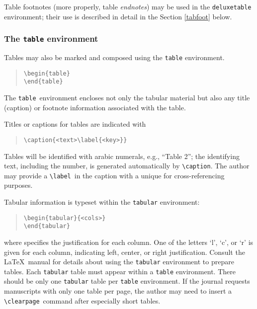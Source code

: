 \documentclass[preprint2]{aastex}
\begin{document}
Table footnotes (more properly, table \emph{endnotes}) 
may be used in the \texttt{deluxetable} environment; 
their use is described in detail in the Section 
 \ref{tabfoot} below. 
 
\subsubsection{The {\tt table} environment} 
 
Tables may also be marked and composed using the \texttt{table} environment. 
\begin{quote} 
\begin{verbatim} 
\begin{table} 
\end{table} 
\end{verbatim} 
\end{quote} 
The 
\texttt{table}\ environment 
encloses not only the tabular 
material but also any title (caption) or footnote information 
associated with the table. 
 
Titles or captions for tables are indicated with 
\begin{quote} 
\begin{verbatim} 
\caption{<text>\label{<key>}} 
\end{verbatim} 
\end{quote} 
Tables will be identified with arabic numerals, e.g., ``Table 2''; 
the identifying text, including the number, is generated automatically 
by \verb"\caption". 
 The author 
may provide a \verb"\label"\ in the caption with a unique  
for cross-referencing 
purposes. 
 
Tabular information is typeset within the 
\texttt{tabular} environment: 
\begin{quote} 
\begin{verbatim} 
\begin{tabular}{<cols>} 
\end{tabular} 
\end{verbatim} 
\end{quote} 
where  specifies the justification for each column. 
One of the letters `l', `c', or `r' is given for each column, 
indicating left, center, or right justification. 
Consult the \LaTeX\ manual \citep{Lamport} for details about using 
the 
\texttt{tabular} environment 
to prepare tables. 
Each \texttt{tabular} table must appear within a \texttt{table} 
environment. There should be only one \texttt{tabular} table per 
\texttt{table} 
environment. 
If the journal requests manuscripts with only one table per page, 
the author may need to insert a \verb"\clearpage"\ 
 command after 
especially short tables. 
 
\end{document}
